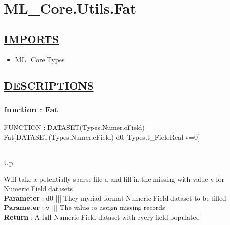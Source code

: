 \chapter*{ML\_Core.Utils.Fat}
\hypertarget{ML_Core.Utils.Fat}{}

\section*{\underline{IMPORTS}}
\begin{itemize}
\item ML\_Core.Types
\end{itemize}

\section*{\underline{DESCRIPTIONS}}
\subsection*{function : Fat}
\hypertarget{ecldoc:ml_core.utils.fat}{FUNCTION : DATASET(Types.NumericField) Fat(DATASET(Types.NumericField) d0, Types.t\_FieldReal v=0)} \\
\hyperlink{ecldoc:}{Up} \\
\par
Will take a potentially sparse file d and fill in the missing with value v for Numeric Field datasets \\
\textbf{Parameter} : d0 ||| They myriad format Numeric Field dataset to be filled \\
\textbf{Parameter} : v ||| The value to assign missing records \\
\textbf{Return} : A full Numeric Field dataset with every field populated \\
